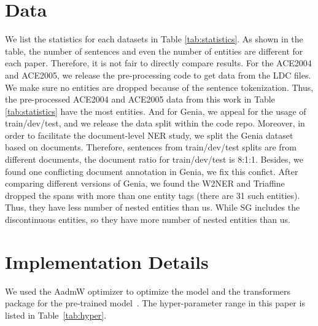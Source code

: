 \documentclass[11pt]{article}
\begin{document}
\section{Data}
We list the statistics for each datasets in Table \ref{tab:statistics}. As shown in the table, the number of sentences and even the number of entities are different for each paper. Therefore, it is not fair to directly compare results. For the ACE2004 and ACE2005, we release the pre-processing code to get data from the LDC files. We make sure no entities are dropped because of the sentence tokenization. Thus, the pre-processed ACE2004 and ACE2005 data from this work in Table \ref{tab:statistics} have the most entities. And for Genia, we appeal for the usage of train/dev/test, and we release the data split within the code repo. Moreover, in order to facilitate the document-level NER study, we split the Genia dataset based on documents. Therefore, sentences from train/dev/test splits are from different documents, the document ratio for train/dev/test is 8:1:1. Besides, we found one conflicting document annotation in Genia, we fix this confict. After comparing different versions of Genia, we found the W2NER \cite{DBLP:conf/aaai/Li00WZTJL22} and Triaffine \cite{DBLP:conf/acl/0002THH22} dropped the spans with more than one entity tags (there are 31 such entities). Thus, they have less number of nested entities than us. While SG \cite{DBLP:conf/acl/WanR0022} includes the discontinuous entities, so they have more number of nested entities than us.



\section{Implementation Details}
We used the AadmW optimizer to optimize the model and the transformers package for the pre-trained model~\cite{wolf-etal-2020-transformers}. 
The hyper-parameter range in this paper is listed in Table~\ref{tab:hyper}.
\end{document}
